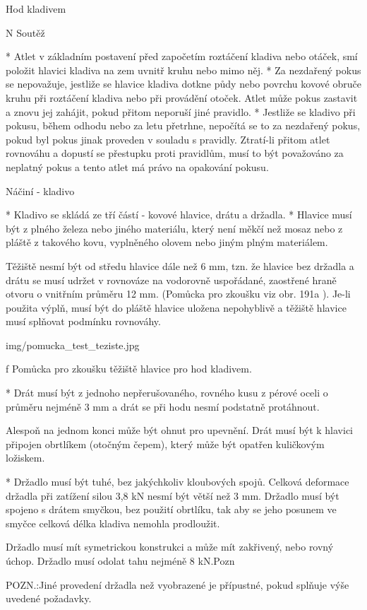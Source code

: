 \secc Hod kladivem

\begitems \style N
Soutěž

* Atlet v základním postavení před započetím roztáčení kladiva nebo otáček, smí položit hlavici kladiva na zem uvnitř kruhu nebo mimo něj.
* Za nezdařený pokus se nepovažuje, jestliže se hlavice kladiva dotkne půdy nebo povrchu kovové obruče kruhu při roztáčení kladiva nebo při provádění otoček. Atlet může pokus zastavit a znovu jej zahájit, pokud přitom neporuší jiné pravidlo.
* Jestliže se kladivo při pokusu, během odhodu nebo za letu přetrhne, nepočítá se to za nezdařený pokus, pokud byl pokus jinak proveden v souladu s pravidly. Ztratí-li přitom atlet rovnováhu a dopustí se přestupku proti pravidlům, musí to být považováno za neplatný pokus a tento atlet má právo na opakování pokusu.

Náčiní - kladivo

* Kladivo se skládá ze tří částí - kovové hlavice, drátu a držadla.
* Hlavice musí být z plného železa nebo jiného materiálu, který není měkčí než mosaz nebo z pláště z takového kovu, vyplněného olovem nebo jiným plným materiálem.

Těžiště nesmí být od středu hlavice dále než 6 mm, tzn. že hlavice bez držadla a drátu se musí udržet v rovnováze na vodorovně uspořádané, zaostřené hraně otvoru o vnitřním průměru 12 mm. (Pomůcka pro zkoušku viz obr. 191a ). Je-li použita výplň, musí být do pláště hlavice uložena nepohyblivě a těžiště hlavice musí splňovat podmínku rovnováhy.

\picw=8cm \inspic img/pomucka_test_teziste.jpg
\caption/f Pomůcka pro zkoušku těžiště hlavice pro hod kladivem.

* Drát musí být z jednoho nepřerušovaného, rovného kusu z pérové oceli o průměru nejméně 3 mm a drát se při hodu nesmí podstatně protáhnout.

Alespoň na jednom konci může být ohnut pro upevnění. Drát musí být k hlavici připojen obrtlíkem (otočným čepem), který může být opatřen kuličkovým ložiskem.

* Držadlo musí být tuhé, bez jakýchkoliv kloubových spojů. Celková deformace držadla při zatížení silou 3,8 kN nesmí být větší než 3 mm. Držadlo musí být spojeno s drátem smyčkou, bez použití obrtlíku, tak aby se jeho posunem ve smyčce celková délka kladiva nemohla prodloužit.

Držadlo musí mít symetrickou konstrukci a může mít zakřivený, nebo rovný úchop. Držadlo musí odolat tahu nejméně 8 kN.Pozn

POZN.:Jiné provedení držadla než vyobrazené je přípustné, pokud splňuje výše uvedené požadavky.


